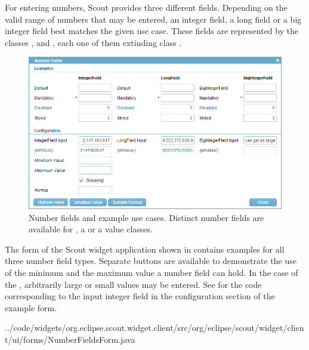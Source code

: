 \documentclass[a4paper,10pt,twoside]{book}
\begin{document}
For entering numbers, Scout provides three different fields.
Depending on the valid range of numbers that may be entered, an integer field, a long field or a big integer field best matches the given use case.
These fields are represented by the classes ,  and , each one of them extinding class .

\begin{figure}
\includegraphics[width=15cm]{numberfield.png}
\caption{Number fields and example use cases.
Distinct number fields are available for , a  or a  value classes.
}
\end{figure}

The form  of the Scout widget application shown in  contains examples for all three number field types.
Separate buttons are available to demonstrate the use of the minimum and the maximum value a number field can hold.
In the case of the , arbitrarily large or small values may be entered. 
See  for the code corresponding to the input integer field in the configuration section of the example form.


{../code/widgets/org.eclipse.scout.widget.client/src/org/eclipse/scout/widget/client/ui/forms/NumberFieldsForm.java}
\end{document}
